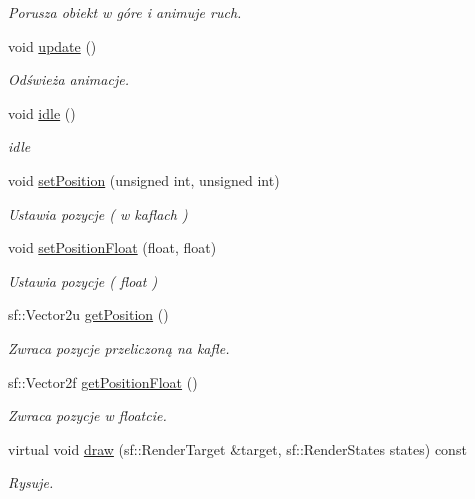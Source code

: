 \begin{DoxyCompactItemize}
\begin{DoxyCompactList}\small\item\em Porusza obiekt w góre i animuje ruch. \end{DoxyCompactList}\item 
\hypertarget{class_entity_a00b6eeaf99b35c8f8b10b5fbfc1baf4f}{void \hyperlink{class_entity_a00b6eeaf99b35c8f8b10b5fbfc1baf4f}{update} ()}\label{class_entity_a00b6eeaf99b35c8f8b10b5fbfc1baf4f}

\begin{DoxyCompactList}\small\item\em Odświeża animacje. \end{DoxyCompactList}\item 
\hypertarget{class_entity_a651d16aa7cc3046e9387912496685ead}{void \hyperlink{class_entity_a651d16aa7cc3046e9387912496685ead}{idle} ()}\label{class_entity_a651d16aa7cc3046e9387912496685ead}

\begin{DoxyCompactList}\small\item\em idle \end{DoxyCompactList}\item 
void \hyperlink{class_entity_af6eeb3e2ab8bfe2885bab25f156ed78b}{set\-Position} (unsigned int, unsigned int)
\begin{DoxyCompactList}\small\item\em Ustawia pozycje ( w kaflach ) \end{DoxyCompactList}\item 
void \hyperlink{class_entity_a727a12d714ee329c92b62f3ba60f79f9}{set\-Position\-Float} (float, float)
\begin{DoxyCompactList}\small\item\em Ustawia pozycje ( float ) \end{DoxyCompactList}\item 
sf\-::\-Vector2u \hyperlink{class_entity_a60954d1d71c33104bf549f39c61dbb9f}{get\-Position} ()
\begin{DoxyCompactList}\small\item\em Zwraca pozycje przeliczoną na kafle. \end{DoxyCompactList}\item 
\hypertarget{class_entity_aa254c3e47aa6d3c4b9e2bbbcc786d93f}{sf\-::\-Vector2f \hyperlink{class_entity_aa254c3e47aa6d3c4b9e2bbbcc786d93f}{get\-Position\-Float} ()}\label{class_entity_aa254c3e47aa6d3c4b9e2bbbcc786d93f}

\begin{DoxyCompactList}\small\item\em Zwraca pozycje w floatcie. \end{DoxyCompactList}\item 
\hypertarget{class_entity_a8a29089df65336842035e9a6b73677f6}{virtual void \hyperlink{class_entity_a8a29089df65336842035e9a6b73677f6}{draw} (sf\-::\-Render\-Target \&target, sf\-::\-Render\-States states) const }\label{class_entity_a8a29089df65336842035e9a6b73677f6}

\begin{DoxyCompactList}\small\item\em Rysuje. \end{DoxyCompactList}\end{DoxyCompactItemize}
